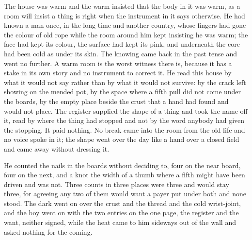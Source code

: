 The house was warm and the warm insisted that the body in it was warm, as a room will insist a thing is right when the instrument in it says otherwise. He had known a man once, in the long time and another country, whose fingers had gone the colour of old rope while the room around him kept insisting he was warm; the face had kept its colour, the surface had kept its pink, and underneath the core had been cold as  under its skin. The knowing came back in the past tense and went no further. A warm room is the worst witness there is, because it has a stake in its own story and no instrument to correct it. He read this house by what it would not say rather than by what it would not survive: by the crack left showing on the mended pot, by the space where a fifth pull did not come under the boards, by the empty place beside the crust that a hand had found and would not place. The register supplied the shape of a thing and took the name off it, read by where the thing had stopped and not by the word anybody had given the stopping. It paid nothing. No break came into the room from the old life and no voice spoke in it; the shape went over the day like a hand over a closed field and came away without dressing it.

He counted the nails in the boards without deciding to, four on the near board, four on the next, and a knot the width of a thumb where a fifth might have been driven and was not. Three counts in three places were three and would stay three, for agreeing any two of them would want a payer put under both and none stood. The dark went on over the crust and the thread and the cold wrist-joint, and the boy went on with the two entries on the one page, the register and the want, neither signed, while the heat came to him sideways out of the wall and asked nothing for the coming.

\scenebreak

